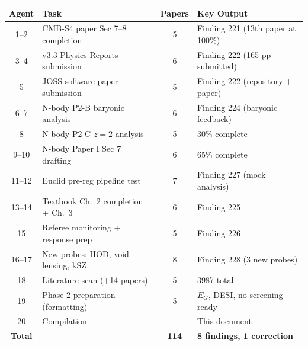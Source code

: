 \documentclass[11pt,a4paper]{article}
\begin{document}
\begin{center}
\begin{tabular}{clcl}
\toprule
\textbf{Agent} & \textbf{Task} & \textbf{Papers} & \textbf{Key Output} \\
\midrule
1--2 & CMB-S4 paper Sec 7--8 completion & 5 & Finding 221 (13th paper at 100\%) \\
3--4 & v3.3 Physics Reports submission & 6 & Finding 222 (165 pp submitted) \\
5 & JOSS software paper submission & 5 & Finding 222 (repository + paper) \\
6--7 & N-body P2-B baryonic analysis & 6 & Finding 224 (baryonic feedback) \\
8 & N-body P2-C $z=2$ analysis & 5 & 30\% complete \\
9--10 & N-body Paper I Sec 7 drafting & 6 & 65\% complete \\
11--12 & Euclid pre-reg pipeline test & 7 & Finding 227 (mock analysis) \\
13--14 & Textbook Ch.\ 2 completion + Ch.\ 3 & 6 & Finding 225 \\
15 & Referee monitoring + response prep & 5 & Finding 226 \\
16--17 & New probes: HOD, void lensing, kSZ & 8 & Finding 228 (3 new probes) \\
18 & Literature scan (+14 papers) & 5 & 3987 total \\
19 & Phase 2 preparation (formatting) & 5 & $E_G$, DESI, no-screening ready \\
20 & Compilation & --- & This document \\
\midrule
\textbf{Total} & & \textbf{114} & \textbf{8 findings, 1 correction} \\
\bottomrule
\end{tabular}
\end{center}
\end{document}
